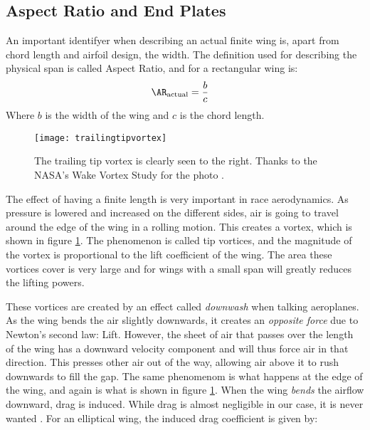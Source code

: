   \subsection{Aspect Ratio and End Plates}
  \label{subsec:endplates}

    An important identifyer when describing an actual finite wing is, apart from chord length and airfoil design, the width. The definition used for describing the physical span is called Aspect Ratio, and for a rectangular wing is:
    \begin{align}
        \AR_\text{actual} &= \frac{b}{c}
        \label{eq:ARactual}
    \end{align}
    Where $b$ is the width of the wing and $c$ is the chord length.

    \begin{figure}
      \texttt{[image: trailingtipvortex]}
      \caption{The trailing tip vortex is clearly seen to the right. Thanks to the NASA's Wake Vortex Study for the photo \cite{nasatipvortex}.}
      \label{fig:trailingtipvortices}
    \end{figure}

    The effect of having a finite length is very important in race aerodynamics. As pressure is lowered and increased on the different sides, air is going to travel around the edge of the wing in a rolling motion. This creates a vortex, which is shown in figure \ref{fig:trailingtipvortices}. The phenomenon is called tip vortices, and the magnitude of the vortex is proportional to the lift coefficient of the wing. The area these vortices cover is very large and for wings with a small span will greatly reduces the lifting powers.

    These vortices are created by an effect called \emph{downwash} when talking aeroplanes. As the wing bends the air slightly downwards, it creates an \emph{opposite force} due to Newton's second law: Lift. However, the sheet of air that passes over the length of the wing has a downward velocity component and will thus force air in that direction. This presses other air out of the way, allowing air above it to rush downwards to fill the gap. The same phenomenom is what happens at the edge of the wing, and again is what is shown in figure \ref{fig:trailingtipvortices}. When the wing \emph{bends} the airflow downward, drag is induced. While drag is almost negligible in our case, it is never wanted \cite{peterkampf}. For an elliptical wing, the induced drag coefficient is given by:

